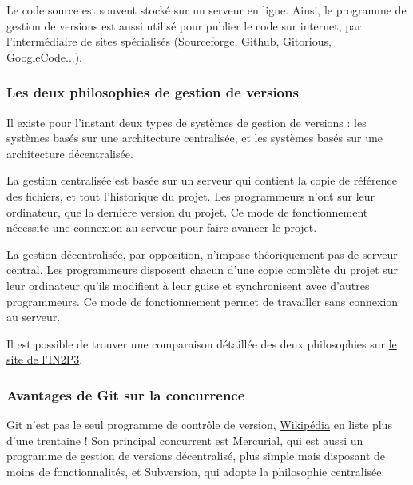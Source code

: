 Le code source est souvent stocké sur un serveur en ligne.
Ainsi, le programme de gestion de versions est aussi utilisé
pour publier le code sur internet, par l'intermédiaire de sites spécialisés
(Sourceforge, Github, Gitorious, GoogleCode...).


\subsubsection{Les deux philosophies de gestion de versions} 

Il existe pour l'instant deux types de systèmes de gestion de versions : 
les systèmes basés sur une architecture centralisée,
et les systèmes basés sur une architecture décentralisée.

La gestion centralisée est basée sur un serveur qui contient la copie de référence des fichiers, 
et tout l'historique du projet. 
Les programmeurs n'ont sur leur ordinateur, que la dernière version du projet. 
Ce mode de fonctionnement nécessite une connexion au serveur pour faire avancer le projet.

La gestion décentralisée, par opposition, n'impose théoriquement pas de serveur central.
Les programmeurs disposent chacun d'une copie complète du projet sur leur ordinateur
qu'ils modifient à leur guise et synchronisent avec d'autres programmeurs.
Ce mode de fonctionnement permet de travailler sans connexion au serveur.

Il est possible de trouver une comparaison détaillée des deux philosophies sur
\href{http://informatique.in2p3.fr/?q=node/333}{le site de l'IN2P3}.


\subsubsection{Avantages de Git sur la concurrence}

Git n'est pas le seul programme de contrôle de version,
\href{http://en.wikipedia.org/wiki/Comparison_of_revision_control_software}{Wikipédia} en liste plus d'une trentaine !
Son principal concurrent est Mercurial, qui est aussi un programme de gestion de versions décentralisé,
plus simple mais disposant de moins de fonctionnalités, et Subversion, qui adopte la philosophie centralisée.

